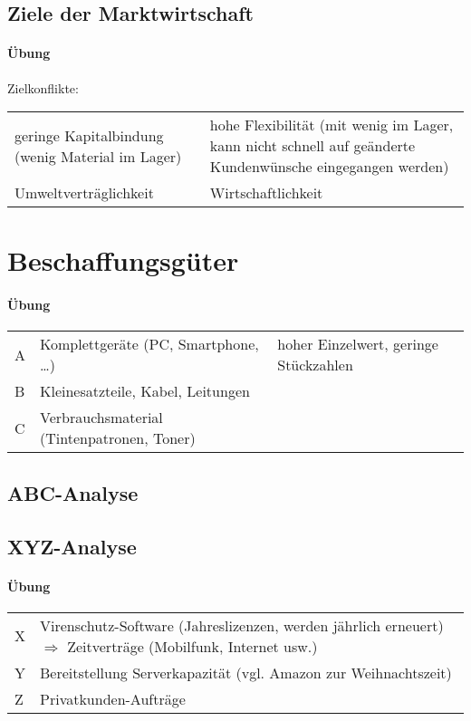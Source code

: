\subsection{Ziele der Marktwirtschaft}
\paragraph{Übung} Zielkonflikte:\\
\begin{tabular}{L{0.5} L{0.5}}
geringe Kapitalbindung (wenig Material im Lager) & hohe Flexibilität (mit wenig im Lager, kann nicht schnell auf geänderte Kundenwünsche eingegangen werden)\tabularnewline
Umweltverträglichkeit & Wirtschaftlichkeit
\end{tabular}
\section{Beschaffungsgüter}
\paragraph{Übung} \parskp
\begin{tabular}{l l l }
A & Komplettgeräte (PC, Smartphone, …) & hoher Einzelwert, geringe Stückzahlen\\
B & Kleinesatzteile, Kabel, Leitungen \\
C & Verbrauchsmaterial (Tintenpatronen, Toner)
\end{tabular}
\subsection{ABC-Analyse}
\subsection{XYZ-Analyse}
\paragraph{Übung} \parskp
\begin{tabular}{L{0.1} L{0.9}}
X & Virenschutz-Software (Jahreslizenzen, werden jährlich erneuert) $\Rightarrow$ Zeitverträge (Mobilfunk, Internet usw.)\\
Y & Bereitstellung Serverkapazität (vgl. Amazon zur Weihnachtszeit)\\
Z & Privatkunden-Aufträge
\end{tabular}
